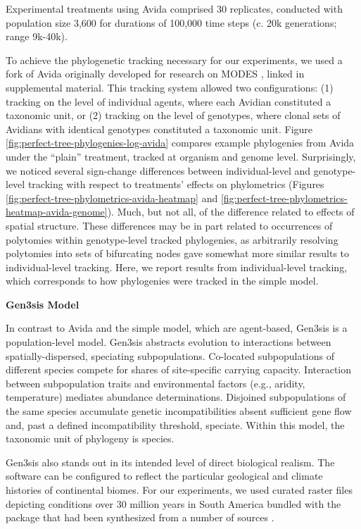 

Experimental treatments using Avida comprised 30 replicates, conducted with population size 3,600 for durations of 100,000 time steps (c. 20k generations; range 9k-40k).

To achieve the phylogenetic tracking necessary for our experiments, we used a fork of Avida originally developed for research on MODES \citep{dolson2019modes}, linked in supplemental material.
This tracking system allowed two configurations: (1) tracking on the level of individual agents, where each Avidian constituted a taxonomic unit, or (2) tracking on the level of genotypes, where clonal sets of Avidians with identical genotypes constituted a taxonomic unit.
Figure \ref{fig:perfect-tree-phylogenies-log-avida} compares example phylogenies from Avida under the ``plain'' treatment, tracked at organism and genome level.
Surprisingly, we noticed several sign-change differences between individual-level and genotype-level tracking with respect to treatments' effects on phylometrics (Figures \ref{fig:perfect-tree-phylometrics-avida-heatmap} and \ref{fig:perfect-tree-phylometrics-heatmap-avida-genome}).
Much, but not all, of the difference related to effects of spatial structure.
These differences may be in part related to occurrences of polytomies within genotype-level tracked phylogenies, as arbitrarily resolving polytomies into sets of bifurcating nodes gave somewhat more similar results to individual-level tracking.
Here, we report results from individual-level tracking, which corresponds to how phylogenies were tracked in the simple model.


\noindent
\textbf{Gen3sis Model}


\noindent
In contrast to Avida and the simple model, which are agent-based, Gen3sis is a population-level model.
Gen3sis abstracts evolution to interactions between spatially-dispersed, speciating subpopulations.
Co-located subpopulations of different species compete for shares of site-specific carrying capacity.
Interaction between subpopulation traits and environmental factors (e.g., aridity, temperature) mediates abundance determinations.
Disjoined subpopulations of the same species accumulate genetic incompatibilities absent sufficient gene flow and, past a defined incompatibility threshold, speciate.
Within this model, the taxonomic unit of phylogeny is species.

Gen3sis also stands out in its intended level of direct biological realism.
The software can be configured to reflect the particular geological and climate histories of continental biomes.
For our experiments, we used curated raster files depicting conditions over 30 million years in South America bundled with the package that had been synthesized from a number of sources \citep{straume2020global,westerhold2020astronomically,fick2017worldclim,hagen2019mountain,annan2013new,cramwinckel2018synchronous,evans2018eocene,hollis2019deepmip,hutchinson2018climate,keating2011warm,sijp2014role,zhang2019evolution}.

